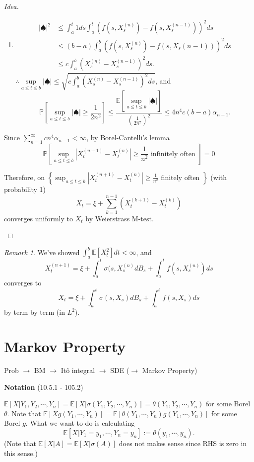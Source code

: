 \documentclass[12pt]{report}
\renewcommand{\P}{\mathbb{P}}
\newcommand{\E}{\mathbb{E}}
\renewcommand{\1}{\mathbb{1}}
\theoremstyle{break}
\theoremstyle{newdef}
\theoremstyle{remark}
\newtheorem*{rem}{Remark} %
\begin{document}
\begin{proof}[Idea]
\begin{enumerate}[wide]
\begin{enumerate}[wide]
\item
$$
\begin{aligned}
|\spadesuit|^2 &\leq \int_a^t 1ds \int_a^t \left(f(s,X_s^{(n)}) - f(s,X_s^{(n-1)}) \right)^2ds\\
&\leq (b-a) \int_a^b \left( f(s,X_s^{(n)}) - f(s,X_s{(n-1)}) \right)^2 ds\\
&\leq c\int_a^b \left( X_s^{(n)} - X_s^{(n-1)} \right)^2ds.
\end{aligned}
$$
$\therefore \sup\limits_{a\leq t\leq b} |\spadesuit| \leq \sqrt{c\int_a^b \left( X_s^{(n)} - X_s^{(n-1)}\right)^2ds}$, and
$$
\P\left[ \sup\limits_{a\leq t\leq b} |\spadesuit| \geq \frac{1}{2n^2} \right] \leq \frac{\E\left[ \sup\limits_{a\leq t\leq b} |\spadesuit| \right]}{(\frac{1}{2n^2})^2} \leq 4n^4c (b-a)\alpha_{n-1}.
$$
\end{enumerate}


Since $\sum_{n=1}^\infty cn^4\alpha_{n-1} < \infty$, by Borel-Cantelli's lemma
$$
\P\left[\sup_{a\leq t \leq b} \left|X_t^{(n+1)} - X_t^{(n)}\right|  \geq \frac{1}{n^2} \text{ infinitely often }\right] = 0
$$

Therefore, on $\left\{ \sup_{a\leq t \leq b} \left| X_t^{(n+1)} - X_t^{(n)} \right| \geq \frac{1}{n^2} \text{ finitely often } \right\}$ (with probability 1)
$$
X_t = \xi + \sum_{k=1}^{n-1}\left(X_t^{(k+1)} - X_t^{(k)}\right)
$$
converges uniformly to $X_t$ by Weierstrass M-test.
\end{enumerate}

\end{proof}


\begin{rem}
We've showed $\int_a^b \E\left[ X_t^2\right]dt < \infty$, and
$$
X_t^{(n+1)} = \xi + \int_a^t \sigma(s,X_s^{(n)}dB_s + \int_a^t f(s,X_s^{(n)})ds
$$
converges to
$$
X_t = \xi + \int_a^t \sigma(s,X_s)dB_s + \int_a^t f(s,X_s)ds
$$
by term by term (in $L^2$).

\end{rem}


\setcounter{section}{4}
\section{Markov Property}

Prob $\rightarrow$ BM $\rightarrow$ It\^o integral $\rightarrow$ SDE ($\rightarrow$ Markov Property)

\textbf{Notation} (10.5.1 - 105.2)

$\E[X | Y_1, Y_2, \cdots, Y_n] = \E[X | \sigma(Y_1, Y_2, \cdots, Y_n)] = \theta(Y_1, Y_2, \cdots, Y_n)$ for some Borel $\theta$.
Note that $\E[Xg(Y_1, \cdots, Y_n)] = \E[\theta(Y_1, \cdots, Y_n)g(Y_1,\cdots,Y_n)]$ for some Borel $g$.
What we want to do is calculating
\[
\E[X | Y_1 = y_1, \cdots, Y_n = y_n] := \theta(y_1,\cdots,y_n).
\]
(Note that $\E[X|A] = \E[X|\sigma(A)]$ does not makes sense since RHS is zero in this sense.)
\end{document}
